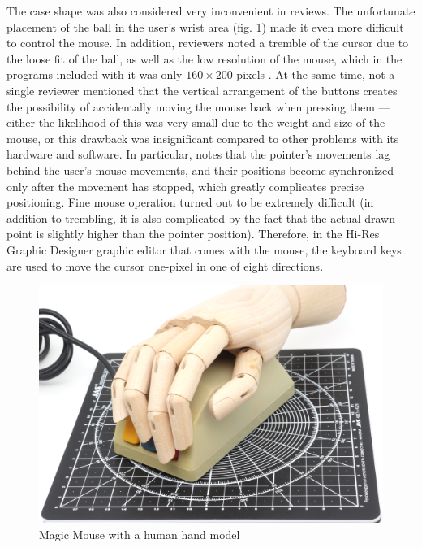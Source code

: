 \documentclass[11pt, a4paper]{article}
\begin{document}
The case shape was also considered very inconvenient in reviews. The unfortunate placement of the ball in the user's wrist area (fig. \ref{fig:MagicMouseHand}) made it even more difficult to control the mouse. In addition, reviewers noted a tremble of the cursor due to the loose fit of the ball, as well as the low resolution of the mouse, which in the programs included with it was only $160 \times 200$ pixels \cite{SMC_Mouse_Commodore3}. At the same time, not a single reviewer mentioned that the vertical arrangement of the buttons creates the possibility of accidentally moving the mouse back when pressing them --- either the likelihood of this was very small due to the weight and size of the mouse, or this drawback was insignificant compared to other problems with its hardware and software. In particular, \cite{SMC_Mouse_Commodore3} notes that the pointer's movements lag behind the user's mouse movements, and their positions become synchronized only after the movement has stopped, which greatly complicates precise positioning. Fine mouse operation turned out to be extremely difficult (in addition to trembling, it is also complicated by the fact that the actual drawn point is slightly higher than the pointer position). Therefore, in the Hi-Res Graphic Designer graphic editor that comes with the mouse, the keyboard keys are used to move the cursor one-pixel in one of eight directions.

\begin{figure}[h]
    \centering
    \includegraphics[scale=0.54]{1985_smc_contriver_magic_mouse/hand_30.jpg}
    \caption{Magic Mouse with a human hand model}
    \label{fig:MagicMouseHand}
\end{figure}
\end{document}
